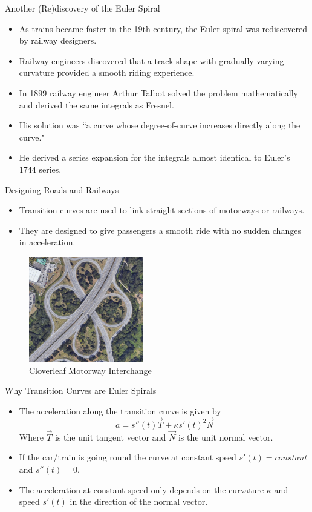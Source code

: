 \documentclass{beamer}
\begin{document}
\begin{frame}{Another (Re)discovery of the Euler Spiral}
	\begin{itemize}
		\item As trains became faster in the 19th century, the Euler spiral was rediscovered by railway designers.
		\item Railway engineers discovered that a track shape with gradually varying curvature provided a smooth riding experience.
		\item In 1899 railway engineer Arthur Talbot solved the problem mathematically and derived the same integrals as Fresnel.
		\item His solution was ``a curve whose degree-of-curve increases directly along the curve."
		\item He derived a series expansion for the integrals almost identical to Euler's 1744 series. 
	\end{itemize}
\end{frame}

\begin{frame}{Designing Roads and Railways}
	\begin{itemize}
		\item Transition curves are used to link straight sections of motorways or railways.
		\item They are designed to give passengers a smooth ride with no sudden changes in acceleration.

	\end{itemize}
		\begin{figure}
		\caption{Cloverleaf Motorway Interchange}
		\centering
		\includegraphics[width=50mm, scale=0.5]{cloverleaf_motorway.png}
	\end{figure}

\end{frame}

\begin{frame}{Why Transition Curves are Euler Spirals}
	\begin{itemize}
	\item The acceleration along the transition curve is given by
 	 \[
 	 a=s''(t) \vec{T}+\kappa s'(t)^2 \vec{N}
 	 \]
 	 Where $\vec{T}$ is the unit tangent vector and $\vec{N}$ is the unit normal vector.
 	 \item If the car/train is going round the curve at constant speed $s'(t)=constant$ and $s''(t)=0$.	
 	 \item The acceleration at constant speed only depends on the curvature $\kappa$ and speed $s'(t)$ in the direction of the normal vector.
	\end{itemize}
\end{frame}
\end{document}
